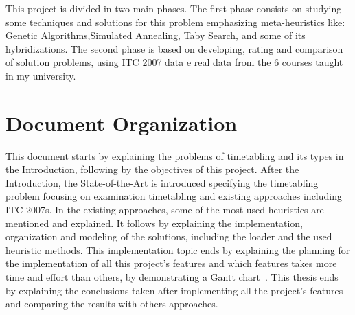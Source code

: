 This project is divided in two main phases. The first phase consists on studying some techniques and solutions for this problem emphasizing meta-heuristics like: Genetic Algorithms,Simulated Annealing, Taby Search, and some of its hybridizations. The second phase is based on developing, rating and comparison of solution problems, using ITC 2007 data e real data from the 6 courses taught in my university.


\section{Document Organization}

This document starts by explaining the problems of timetabling and its types in the Introduction, following by the objectives of this project. After the Introduction, the State-of-the-Art is introduced specifying the timetabling problem focusing on examination timetabling and existing approaches including ITC 2007s. In the existing approaches, some of the most used heuristics are mentioned and explained. It follows by explaining the implementation, organization and modeling of the solutions, including the loader and the used heuristic methods. This implementation topic ends by explaining the planning for the implementation of all this project's features and which features takes more time and effort than others, by demonstrating a Gantt chart~\cite{Wilson2003}. This thesis ends by explaining the conclusions taken after implementing all the project's features and comparing the results with others approaches.





